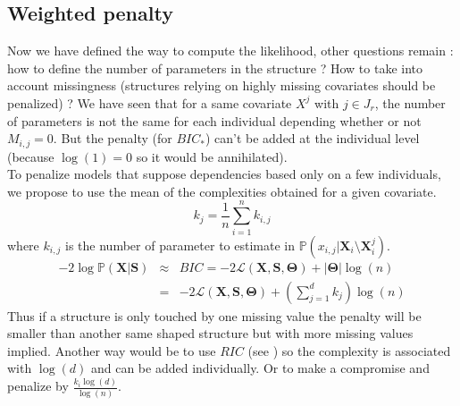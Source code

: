 \documentclass[12pt,a4paper]{report}
\begin{document}
%
%
	\subsection{Weighted penalty}
			Now we have defined the way to compute the likelihood, other questions remain : how to define the number of parameters in the structure ?		How to take into account missingness (structures relying on highly missing covariates should be penalized) ?
			We have seen that for a same covariate $X^j$ with $ j \in J_r$, the number of parameters is not the same for each individual depending whether or not $M_{i,j}=0$. But the penalty (for $BIC_*$) can't be added at the individual level (because $\log(1)=0$ so it would be annihilated). \\
			
			To penalize models that suppose dependencies based only on a few individuals, we propose to use the mean of the complexities obtained for a given covariate.
			\begin{equation}
			k_j=\frac{1}{n}\sum_{i=1}^nk_{i,j}
\end{equation}						where $k_{i,j}$ is the number of parameter to estimate in $\mathbb{P}(x_{i,j}|\boldsymbol{X}_i\setminus \boldsymbol{X}_i^j)$.
			\begin{eqnarray}
		-2\log \mathbb{P}(\boldsymbol{X}|\boldsymbol{S})&\approx & BIC=-2\mathcal{L}(\boldsymbol{X},\boldsymbol{S},\boldsymbol{\Theta})+|\boldsymbol{\Theta}|\log(n) \\
		&=& -2\mathcal{L}(\boldsymbol{X},\boldsymbol{S},\boldsymbol{\Theta})+(\sum_{j=1}^dk_j)\log(n)
	\end{eqnarray}
			 Thus if a structure is only touched by one missing value the penalty will be smaller than another same shaped structure but with more missing values implied.
			Another way would be to use $RIC$ (see \cite{foster1994risk}) so the complexity is associated with $\log(d)$ and can be added individually. Or to make a compromise and penalize by $\frac{k_i\log(d)}{\log(n)}$.
		
\end{document}
